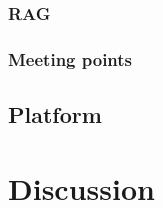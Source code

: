 \documentclass[twoside]{uva-inf-bachelor-thesis}
\begin{document}
\subsection{RAG}

\subsection{Meeting points}

\section{Platform}

\chapter{Discussion}

\printbibliography
\end{document}
